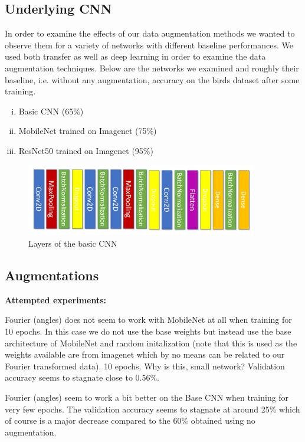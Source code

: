 \documentclass{article}
\begin{document}
\subsection{Underlying CNN}

In order to examine the effects of our data augmentation methods we wanted to observe them for a variety of networks with different baseline performances. We used both transfer as well as deep learning in order to examine the data augmentation techniques. Below are the networks we examined and roughly their baseline, i.e. without any augmentation, accuracy on the birds dataset after some training.

\begin{enumerate}[(i)]
 \item Basic CNN (65\%)
 \item MobileNet trained on Imagenet (75\%)
 \item ResNet50 trained on Imagenet (95\%)
\end{enumerate}

\begin{figure}[h]
	\includegraphics[width=0.9\textwidth]{conv.png}
	\caption{Layers of the basic CNN}
\end{figure}

\subsection{Augmentations}

\textbf{Attempted experiments:}

Fourier (angles) does not seem to work with MobileNet at all when training for 10 epochs. In this case we do not use the base weights but instead use the base architecture of MobileNet and random initalization (note that this is used as the weights available are from imagenet which by no means can be related to our Fourier transformed data). 10 epochs. Why is this, small network? Validation accuracy seems to stagnate close to 0.56\%.

Fourier (angles) seem to work a bit better on the Base CNN when training for very few epochs. The validation accuracy seems to stagnate at around 25\% which of course is a major decrease compared to the 60\% obtained using no augmentation.
\end{document}
